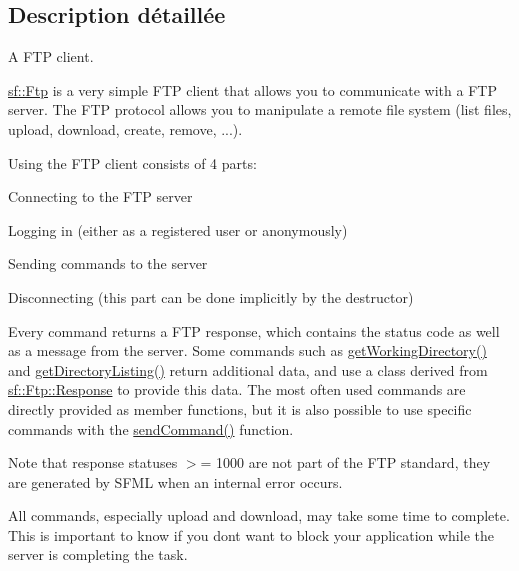 \subsection{Description détaillée}
A F\+TP client. 

\hyperlink{classsf_1_1Ftp}{sf\+::\+Ftp} is a very simple F\+TP client that allows you to communicate with a F\+TP server. The F\+TP protocol allows you to manipulate a remote file system (list files, upload, download, create, remove, ...).

Using the F\+TP client consists of 4 parts\+: \begin{DoxyItemize}
\item Connecting to the F\+TP server \item Logging in (either as a registered user or anonymously) \item Sending commands to the server \item Disconnecting (this part can be done implicitly by the destructor)\end{DoxyItemize}
Every command returns a F\+TP response, which contains the status code as well as a message from the server. Some commands such as \hyperlink{classsf_1_1Ftp_a79c654fcdd0c81e68c4fa29af3b45e0c}{get\+Working\+Directory()} and \hyperlink{classsf_1_1Ftp_a8f37258e461fcb9e2a0655e9df0be4a0}{get\+Directory\+Listing()} return additional data, and use a class derived from \hyperlink{classsf_1_1Ftp_1_1Response}{sf\+::\+Ftp\+::\+Response} to provide this data. The most often used commands are directly provided as member functions, but it is also possible to use specific commands with the \hyperlink{classsf_1_1Ftp_a44e095103ecbce175a33eaf0820440ff}{send\+Command()} function.

Note that response statuses $>$= 1000 are not part of the F\+TP standard, they are generated by S\+F\+ML when an internal error occurs.

All commands, especially upload and download, may take some time to complete. This is important to know if you don\textquotesingle{}t want to block your application while the server is completing the task.

